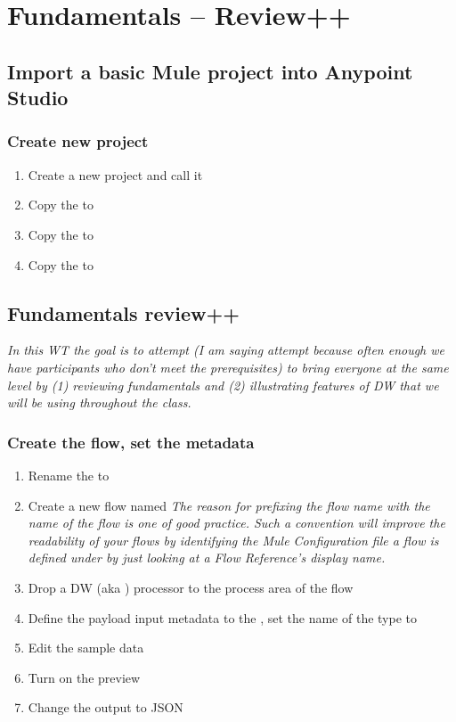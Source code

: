 \chapter{Fundamentals -- Review++}
\section{Import a basic Mule project into Anypoint Studio}
\subsection{Create new project}
\begin{enumerate}
\item Create a new project and call it 
\item Copy the  to 
\item Copy the  to 
\item Copy the  to 
\end{enumerate}

\section{Fundamentals review++}
\emph{
  In this WT the goal is to attempt (I am saying attempt because often enough we have participants who don’t meet the prerequisites) to bring everyone at the same level by (1) reviewing fundamentals and (2) illustrating features of DW that we will be using throughout the class.
}

\subsection{Create the flow, set the metadata}
\begin{enumerate}
\item Rename the  to 
\item Create a new flow named 
  \newline
  \emph{
    The reason for prefixing the flow name with the name of the flow is one of good practice.
    Such a convention will improve the readability of your flows by identifying the
    Mule Configuration file a flow is defined under by just looking at a Flow Reference's
    display name.
  }
\item Drop a DW (aka ) processor to the process area of the flow
\item Define the payload input metadata to the ,
  set the name of the type to 
\item Edit the sample data
\item Turn on the preview
\item Change the output to JSON
\end{enumerate}

